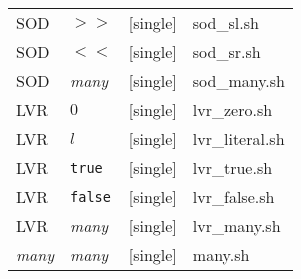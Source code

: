 \begin{table}[h]
\begin{tabular}{|llll|}
SOD	&	$>>$	&	[single]	&	sod\_sl.sh \\
SOD	&	$<<$	&	[single]	&	sod\_sr.sh \\
SOD	&	\textit{many}	&	[single]	&	sod\_many.sh \\
LVR	&	$0$	&	[single]	&	lvr\_zero.sh \\
LVR	&	$l$	&	[single]	&	lvr\_literal.sh \\
LVR	&	\texttt{true}	&	[single]	&	lvr\_true.sh \\
LVR	&	\texttt{false}	&	[single]	&	lvr\_false.sh \\
LVR	&	\textit{many}	&	[single]	&	lvr\_many.sh \\
\textit{many}	&	\textit{many}	&	[single]	& many.sh	 \\
\hline
\end{tabular}
\end{table}